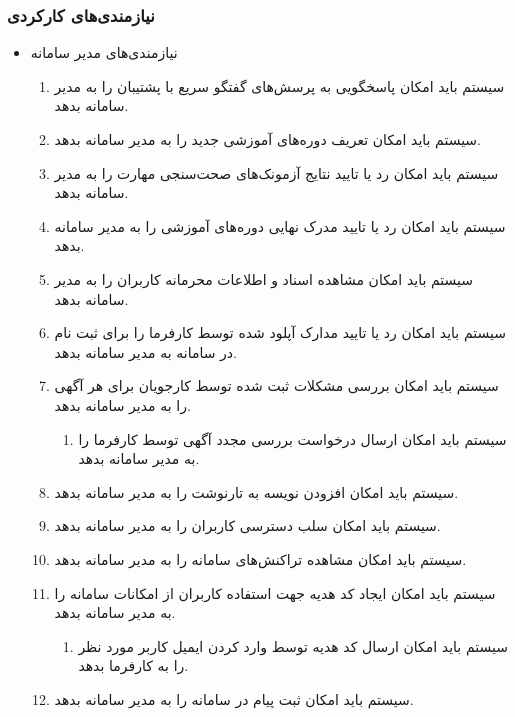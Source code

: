 \documentclass[12pt]{article}
\begin{document}
	\subsubsection{نیازمندی‌های کارکردی}
	\begin{itemize}
		\item
		نیازمندی‌های مدیر سامانه
		\begin{enumerate}
			\renewcommand{\labelenumi}{-R\arabic{enumi}}
			\item سیستم باید امکان پاسخگویی به پرسش‌های گفتگو سریع با پشتیبان را به مدیر سامانه بدهد.
			\item سیستم باید امکان تعریف دوره‌های آموزشی جدید را به مدیر سامانه بدهد.
			\item سیستم باید امکان رد یا تایید نتایج آزمونک‌های صحت‌سنجی مهارت را به مدیر سامانه بدهد.
			\item سیستم باید امکان رد یا تایید مدرک نهایی دوره‌های آموزشی را به مدیر سامانه بدهد.
			\item سیستم باید امکان مشاهده اسناد و اطلاعات محرمانه کاربران را به مدیر سامانه بدهد.
			\item سیستم باید امکان رد یا تایید مدارک آپلود شده توسط کارفرما را برای ثبت نام در سامانه به مدیر سامانه بدهد.
			\item سیستم باید امکان بررسی مشکلات ثبت شده توسط کارجویان برای هر آگهی را به مدیر سامانه بدهد.
			\begin{enumerate}
				\renewcommand{\labelenumii}{-R\arabic{enumi}.\arabic{enumii}}
				\item سیستم باید امکان ارسال درخواست بررسی مجدد آگهی توسط کارفرما را به مدیر سامانه بدهد.
			\end{enumerate}
			\item سیستم باید امکان افزودن نویسه به تارنوشت را به مدیر سامانه بدهد.
			\item سیستم باید امکان سلب دسترسی کاربران را به مدیر سامانه بدهد.
			\item سیستم باید امکان مشاهده تراکنش‌های سامانه را به مدیر سامانه بدهد.
			\item سیستم باید امکان ایجاد کد هدیه جهت استفاده کاربران از امکانات سامانه را به مدیر سامانه بدهد.
			\begin{enumerate}
				\renewcommand{\labelenumii}{-R\arabic{enumi}.\arabic{enumii}}
				\item سیستم باید امکان ارسال کد هدیه توسط وارد کردن ایمیل کاربر مورد نظر را به کارفرما بدهد.
			\end{enumerate}
			\item سیستم باید امکان ثبت پیام در سامانه را به مدیر سامانه بدهد.

\end{enumerate}
\end{itemize}
\end{document}
